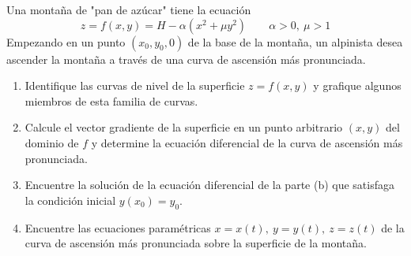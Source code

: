 \item Una montaña de "pan de azúcar" tiene la ecuación
    \[ z = f(x, y) = H - \alpha(x^2 + \mu y^2) \qquad \alpha > 0, \ \mu > 1 \]
    Empezando en un punto $(x_0, y_0, 0)$ de la base de la montaña, un alpinista desea ascender la montaña a través de una curva de ascensión más pronunciada.
    \begin{enumerate}
        \item[(a)] Identifique las curvas de nivel de la superficie $z = f(x, y)$ y grafique algunos miembros de esta familia de curvas.
        \item[(b)] Calcule el vector gradiente de la superficie en un punto arbitrario $(x, y)$ del dominio de $f$ y determine la ecuación diferencial de la curva de ascensión más pronunciada.
        \item[(c)] Encuentre la solución de la ecuación diferencial de la parte (b) que satisfaga la condición inicial $y(x_0) = y_0$.
        \item[(d)] Encuentre las ecuaciones paramétricas $x = x(t), \ y = y(t), \ z = z(t)$ de la curva de ascensión más pronunciada sobre la superficie de la montaña.
    \end{enumerate}

    \begin{center}
    \end{center}
